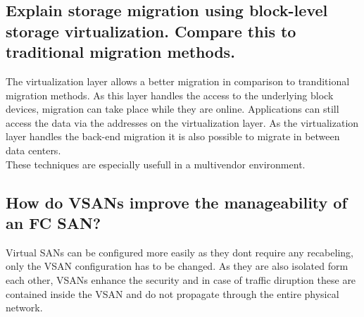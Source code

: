 \subsection{Explain storage migration using block-level storage virtualization. Compare this to traditional migration methods.} %
\label{sub:explain_storage_migration_using_block_level_storage_virtualization_compare_this_to_tranditional_migration_methods}
	The virtualization layer allows a better migration in comparison to tranditional migration methods.
	As this layer handles the access to the underlying block devices,
	migration can take place while they are online.
	Applications can still access the data
	via the addresses on the virtualization layer.
	As the virtualization layer handles the back-end migration
	it is also possible to migrate in between data centers.\\
	These techniques are especially usefull in a multivendor environment.

\subsection{How do VSANs improve the manageability of an FC SAN?} %
\label{sub:how_do_vsans_improve_the_manageability_of_an_fc_san}
	Virtual SANs can be configured more easily as they dont require any recabeling,
	only the VSAN configuration has to be changed.
	As they are also isolated form each other,
	VSANs enhance the security
	and in case of traffic diruption
	these are contained inside the VSAN
	and do not propagate through the entire physical network.

